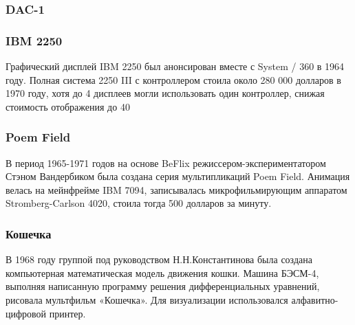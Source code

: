 \documentclass[10pt]{beamer}
\begin{document}
\begin{frame}\frametitle {DAC-1}
{
	
	
}\end{frame}


\begin{frame}\frametitle {IBM 2250}
{
	{
	}
	{
		Графический дисплей IBM 2250 был анонсирован вместе с System / 360 в 1964 году. Полная система 2250 III с контроллером стоила около 280 000 долларов в 1970 году, хотя до 4 дисплеев могли использовать один контроллер, снижая стоимость отображения до 40
	}
	
}\end{frame}


\begin{frame}\frametitle {Poem Field}
{
	{
	}
	{
		В период 1965-1971 годов на основе BeFlix режиссером-экспериментатором Стэном Вандербиком была создана серия мультипликаций Poem Field. Анимация велась на мейнфрейме IBM 7094, записывалась микрофильмирующим аппаратом Stromberg-Carlson 4020, стоила тогда 500 долларов за минуту.
		
		\hfill
		
	}
}\end{frame}

\begin{frame}\frametitle{Кошечка}{
	{
		В 1968 году группой под руководством Н.Н.Константинова была создана компьютерная математическая модель движения кошки. Машина БЭСМ-4, выполняя написанную программу решения дифференциальных уравнений, рисовала мультфильм «Кошечка». Для визуализации использовался алфавитно-цифровой принтер.
		

	}
	{
		
		\hfill 
		
	}
}\end{frame}
\end{document}
